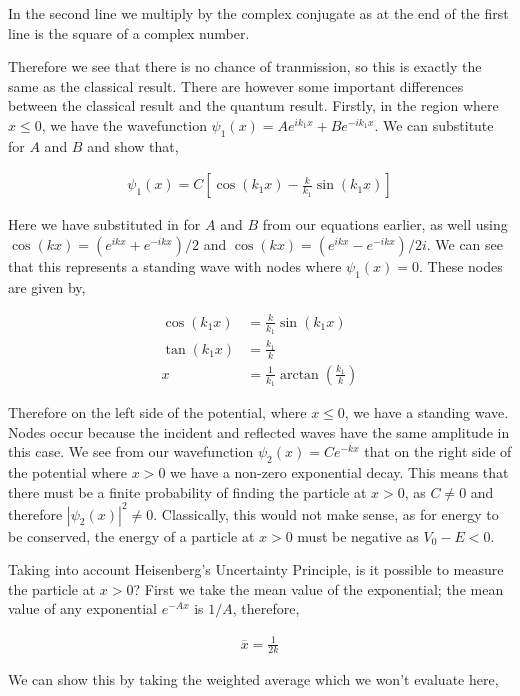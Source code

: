 \documentclass[11pt]{amsart}
\begin{document}
In the second line we multiply by the complex conjugate as at the end of the first line is the square of a complex number.

Therefore we see that there is no chance of tranmission, so this is exactly the same as the classical result. There are however some important differences between the classical result and the quantum result. Firstly, in the region where $x \leq 0$, we have the wavefunction $\psi_1(x) = Ae^{ik_1 x} + Be^{-ik_1 x}$. We can substitute for $A$ and $B$ and show that,

\begin{align*}
  \psi_1(x) = C\left[\cos(k_1 x) - \frac{k}{k_1} \sin(k_1 x)\right]
\end{align*}

Here we have substituted in for $A$ and $B$ from our equations earlier, as well using $\cos(kx) = \left(e^{ikx} + e^{-ikx}\right) / 2$ and $\cos(kx) = \left(e^{ikx} - e^{-ikx}\right) / 2i$. We can see that this represents a standing wave with nodes where $\psi_1(x) = 0$. These nodes are given by,

\begin{align*}
  \cos(k_1 x) &= \frac{k}{k_1} \sin(k_1 x) \\
  \tan(k_1 x) &= \frac{k_1}{k} \\
  x &= \frac{1}{k_1} \arctan{\left(\frac{k_1}{k}\right)}
\end{align*}

Therefore on the left side of the potential, where $x \leq 0$, we have a standing wave. Nodes occur because the incident and reflected waves have the same amplitude in this case. We see from our wavefunction $\psi_2(x) = Ce^{-kx}$ that on the right side of the potential where $x > 0$ we have a non-zero exponential decay. This means that there must be a finite probability of finding the particle at $x > 0$, as $C \neq 0$ and therefore ${|\psi_2(x)|}^2 \neq 0$. Classically, this would not make sense, as for energy to be conserved, the energy of a particle at $x > 0$ must be negative as $V_0 - E < 0$.

Taking into account Heisenberg's Uncertainty Principle, is it possible to measure the particle at $x > 0$? First we take the mean value of the exponential; the mean value of any exponential $e^{-Ax}$ is $1/A$, therefore,

\begin{align*}
  \overline{x} = \frac{1}{2k}
\end{align*}

We can show this by taking the weighted average which we won't evaluate here,
\end{document}
